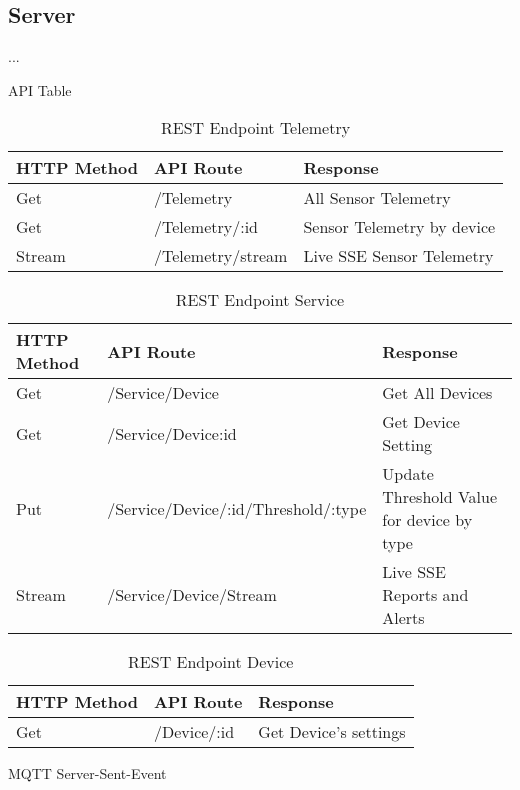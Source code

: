 \subsection{Server}
...

API Table
\begin{table}[H]
    \begin{tabular}{|l|l|l|}
    \hline
    \textbf{HTTP Method}    & \textbf{API Route} & \textbf{Response} \\ \hline
    Get & /Telemetry & All Sensor Telemetry  \\ \hline
    Get & /Telemetry/:id & Sensor Telemetry by device \\ \hline
    Stream & /Telemetry/stream & Live SSE Sensor Telemetry  \\ \hline
    \end{tabular}
    \caption{REST Endpoint Telemetry}
    \label{}
    \end{table}

    \begin{table}[H]
        \begin{tabular}{|l|l|l|}
        \hline
        \textbf{HTTP Method}    & \textbf{API Route} & \textbf{Response} \\ \hline
        Get & /Service/Device & Get All Devices  \\ \hline
        Get & /Service/Device:id & Get Device Setting \\ \hline
        Put & /Service/Device/:id/Threshold/:type & Update Threshold Value for device by type  \\ \hline
        Stream & /Service/Device/Stream & Live SSE Reports and Alerts \\ \hline
        \end{tabular}
        \caption{REST Endpoint Service}
        \label{}
    \end{table}

    \begin{table}[H]
        \begin{tabular}{|l|l|l|}
        \hline
        \textbf{HTTP Method}    & \textbf{API Route} & \textbf{Response} \\ \hline
        Get & /Device/:id & Get Device's settings  \\ \hline
        \end{tabular}
        \caption{REST Endpoint Device}
        \label{}
    \end{table}


MQTT
Server-Sent-Event
